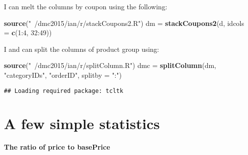 \documentclass[10pt]{report}
\newenvironment{Shaded}{}{}
\newcommand{\KeywordTok}[1]{\textcolor[rgb]{0.00,0.44,0.13}{\textbf{{#1}}}}
\newcommand{\DataTypeTok}[1]{\textcolor[rgb]{0.56,0.13,0.00}{{#1}}}
\newcommand{\DecValTok}[1]{\textcolor[rgb]{0.25,0.63,0.44}{{#1}}}
\newcommand{\StringTok}[1]{\textcolor[rgb]{0.25,0.44,0.63}{{#1}}}
\newcommand{\NormalTok}[1]{{#1}}
\begin{document}
I can melt the columns by coupon using the following:

\begin{Shaded}
\begin{Highlighting}[]
\KeywordTok{source}\NormalTok{(}\StringTok{"~/dmc2015/ian/r/stackCoupons2.R"}\NormalTok{)}
\NormalTok{dm =}\StringTok{ }\KeywordTok{stackCoupons2}\NormalTok{(d, }\DataTypeTok{idcols =} \KeywordTok{c}\NormalTok{(}\DecValTok{1}\NormalTok{:}\DecValTok{4}\NormalTok{, }\DecValTok{32}\NormalTok{:}\DecValTok{49}\NormalTok{))}
\end{Highlighting}
\end{Shaded}

I and can split the columns of product group using:

\begin{Shaded}
\begin{Highlighting}[]
\KeywordTok{source}\NormalTok{(}\StringTok{"~/dmc2015/ian/r/splitColumn.R"}\NormalTok{)}
\NormalTok{dmc =}\StringTok{ }\KeywordTok{splitColumn}\NormalTok{(dm, }\StringTok{"categoryIDs"}\NormalTok{, }\StringTok{"orderID"}\NormalTok{, }\DataTypeTok{splitby =} \StringTok{":"}\NormalTok{)}
\end{Highlighting}
\end{Shaded}

\begin{verbatim}
## Loading required package: tcltk
\end{verbatim}

\section{A few simple statistics}\label{a-few-simple-statistics}

\textbf{The ratio of price to basePrice}

\begin{Shaded}
\end{Shaded}
\end{document}
